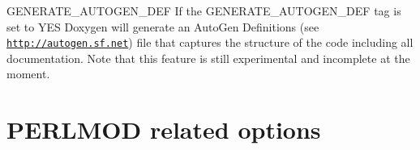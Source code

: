 \begin{DoxyDescription}
\item[{\ttfamily GENERATE\_\-AUTOGEN\_\-DEF} ] If the {\ttfamily GENERATE\_\-AUTOGEN\_\-DEF} tag is set to {\ttfamily YES} Doxygen will generate an AutoGen Definitions (see \href{http://autogen.sf.net}{\tt http://autogen.sf.net}) file that captures the structure of the code including all documentation. Note that this feature is still experimental and incomplete at the moment.


\end{DoxyDescription}\hypertarget{config_perlmod_output}{}\section{PERLMOD related options}\label{config_perlmod_output}
\label{config_cfg_generate_perlmod}
\hypertarget{config_cfg_generate_perlmod}{}
 

